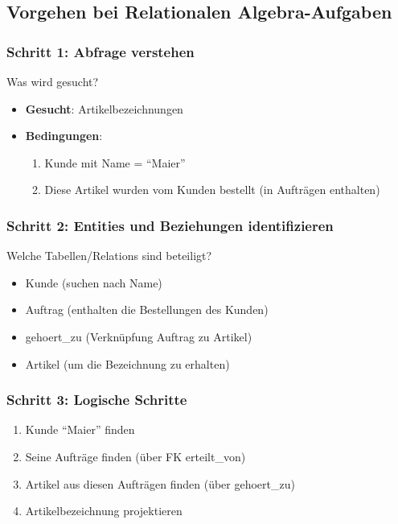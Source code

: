 \documentclass[a4paper]{article}
\begin{document}
\subsection{Vorgehen bei Relationalen Algebra-Aufgaben}

\subsubsection{Schritt 1: Abfrage verstehen}

Was wird gesucht?
\begin{itemize}
    \item \textbf{Gesucht}: Artikelbezeichnungen
    \item \textbf{Bedingungen}: 
    \begin{enumerate}
        \item Kunde mit Name = ``Maier''
        \item Diese Artikel wurden vom Kunden bestellt (in Aufträgen enthalten)
    \end{enumerate}
\end{itemize}

\subsubsection{Schritt 2: Entities und Beziehungen identifizieren}

Welche Tabellen/Relations sind beteiligt?
\begin{itemize}
    \item Kunde (suchen nach Name)
    \item Auftrag (enthalten die Bestellungen des Kunden)
    \item gehoert\_zu (Verknüpfung Auftrag zu Artikel)
    \item Artikel (um die Bezeichnung zu erhalten)
\end{itemize}

\subsubsection{Schritt 3: Logische Schritte}

\begin{enumerate}
    \item Kunde ``Maier'' finden
    \item Seine Aufträge finden (über FK erteilt\_von)
    \item Artikel aus diesen Aufträgen finden (über gehoert\_zu)
    \item Artikelbezeichnung projektieren
\end{enumerate}
\end{document}
